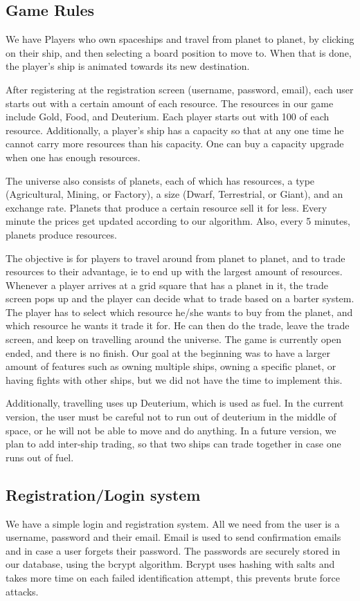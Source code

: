 \documentclass[a4paper,11pt]{article}
\begin{document}
		\subsection{Game Rules}
		
			We have Players who own spaceships and travel from planet to planet, by clicking on their ship, and then selecting a board position to move to. When that is done, the player's ship is animated towards its new destination.
		
			After registering at the registration screen (username, password, email), each user starts out with a certain amount of each resource. The resources in our game include Gold, Food, and Deuterium. Each player starts out with 100 of each resource. Additionally, a player's ship has a capacity so that at any one time he cannot carry more resources than his capacity. One can buy a capacity upgrade when one has enough resources.
		
			The universe also consists of planets, each of which has resources, a type (Agricultural, Mining, or Factory), a size (Dwarf, Terrestrial, or Giant), and an exchange rate. Planets that produce a certain resource sell it for less. Every minute the prices get updated according to our algorithm. Also, every 5 minutes, planets produce resources.
		
			The objective is for players to travel around from planet to planet, and to trade resources to their advantage, ie to end up with the largest amount of resources. Whenever a player arrives at a grid square that has a planet in it, the trade screen pops up and the player can decide what to trade based on a barter system. The player has to select which resource he/she wants to buy from the planet, and which resource he wants it trade it for. He can then do the trade, leave the trade screen, and keep on travelling around the universe. The game is currently open ended, and there is no finish. Our goal at the beginning was to have a larger amount of features such as owning multiple ships, owning a specific planet, or having fights with other ships, but we did not have the time to implement this.
			
			Additionally, travelling uses up Deuterium, which is used as fuel. In the current version, the user must be careful not to run out of deuterium in the middle of space, or he will not be able to move and do anything. In a future version, we plan to add inter-ship trading, so that two ships can trade together in case one runs out of fuel.
			
		
		\subsection{Registration/Login system}
			We have a simple login and registration system. All we need from the user is a username, password and their email. Email is used to send confirmation emails and in case a user forgets their password. The passwords are securely stored in our database, using the bcrypt algorithm. Bcrypt uses hashing with salts and takes more time on each failed identification attempt, this prevents brute force attacks. 
		
\end{document}
